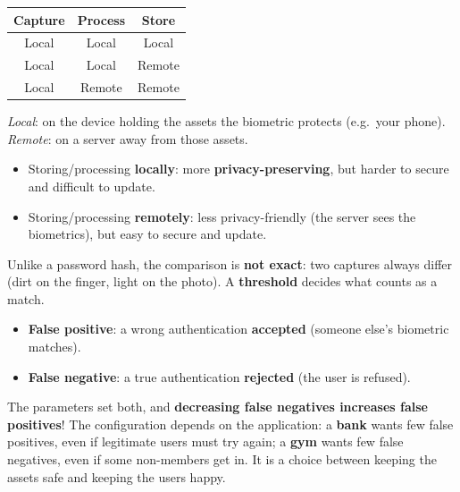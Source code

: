 \begin{propbox}[title={Where do capture, process and store happen?}]
\begin{center}
\begin{tabular}{c|c|c}
\textbf{Capture} & \textbf{Process} & \textbf{Store} \\ \hline
Local & Local  & Local  \\
Local & Local  & Remote \\
Local & Remote & Remote
\end{tabular}
\end{center}
\emph{Local}: on the device holding the assets the biometric protects (e.g.\ your phone).
\emph{Remote}: on a server away from those assets.
\begin{itemize}
  \item Storing/processing \textbf{locally}: more \textbf{privacy-preserving}, but harder to
        secure and difficult to update.
  \item Storing/processing \textbf{remotely}: less privacy-friendly (the server sees the
        biometrics), but easy to secure and update.
\end{itemize}
\end{propbox}

\begin{defnbox}[title=False positives and false negatives]
Unlike a password hash, the comparison is \textbf{not exact}: two captures always differ (dirt on
the finger, light on the photo). A \textbf{threshold} decides what counts as a match.
\begin{itemize}
  \item \textbf{False positive}: a wrong authentication \textbf{accepted} (someone else's
        biometric matches).
  \item \textbf{False negative}: a true authentication \textbf{rejected} (the user is refused).
\end{itemize}
The parameters set both, and \textbf{decreasing false negatives increases false positives}! The
configuration depends on the application: a \textbf{bank} wants few false positives, even if
legitimate users must try again; a \textbf{gym} wants few false negatives, even if some non-members
get in. It is a choice between keeping the assets safe and keeping the users happy.
\end{defnbox}

